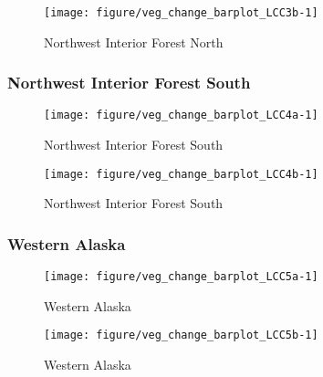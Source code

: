 \documentclass{article}\usepackage[]{graphicx}\usepackage[]{color}
\makeatletter
\def\maxwidth{ %
  \ifdim\Gin@nat@width>\linewidth
    \linewidth
  \else
    \Gin@nat@width
  \fi
}
\makeatother
\begin{document}
\begin{figure}[H]
\texttt{[image: figure/veg\_change\_barplot\_LCC3b-1]} \caption[Northwest Interior Forest North]{Northwest Interior Forest North\label{fig:veg_change_barplot_LCC3b}}
\end{figure}



\subsubsection{Northwest Interior Forest South}
\begin{figure}[H]
\texttt{[image: figure/veg\_change\_barplot\_LCC4a-1]} \caption[Northwest Interior Forest South]{Northwest Interior Forest South\label{fig:veg_change_barplot_LCC4a}}
\end{figure}


\begin{figure}[H]
\texttt{[image: figure/veg\_change\_barplot\_LCC4b-1]} \caption[Northwest Interior Forest South]{Northwest Interior Forest South\label{fig:veg_change_barplot_LCC4b}}
\end{figure}



\subsubsection{Western Alaska}
\begin{figure}[H]
\texttt{[image: figure/veg\_change\_barplot\_LCC5a-1]} \caption[Western Alaska]{Western Alaska\label{fig:veg_change_barplot_LCC5a}}
\end{figure}


\begin{figure}[H]
\texttt{[image: figure/veg\_change\_barplot\_LCC5b-1]} \caption[Western Alaska]{Western Alaska\label{fig:veg_change_barplot_LCC5b}}
\end{figure}
\end{document}
